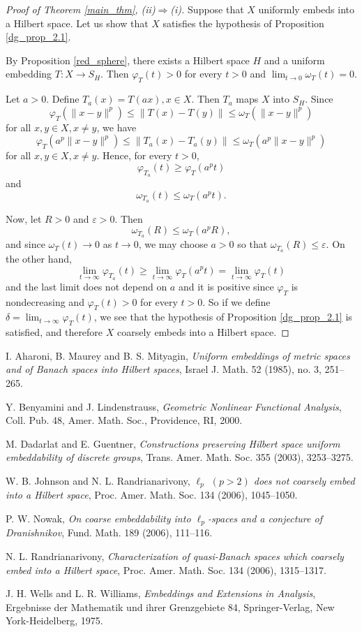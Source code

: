 \documentclass[a4paper,oneside]{amsart}
\theoremstyle{definition}
\begin{document}
\begin{proof}[Proof of Theorem \ref{main_thm}, (ii)$\Rightarrow$(i)]
Suppose that $X$ uniformly embeds into a Hilbert space. Let us show that $X$ satisfies the hypothesis of Proposition \ref{dg_prop_2.1}. 

By Proposition \ref{red_sphere}, there exists a Hilbert space $H$ and a uniform embedding $T:X\to S_H$. Then $\varphi_T(t)>0$ for every $t>0$ and $\lim_{t\to0}\omega_T(t)=0$. 

Let $a>0$. Define $T_a(x)=T(ax),x\in X$. Then $T_a$ maps $X$ into $S_H$. Since 
$$\varphi_T(\|x-y\|^p)\leq\|T(x)-T(y)\|\leq\omega_T(\|x-y\|^p)$$
for all $x,y\in X,x\neq y$, we have
$$\varphi_T(a^p\|x-y\|^p)\leq\|T_a(x)-T_a(y)\|\leq\omega_T(a^p\|x-y\|^p)$$
for all $x,y\in X,x\neq y$. Hence, for every $t>0$,
$$\varphi_{T_a}(t)\geq\varphi_T(a^pt)$$
and
$$\omega_{T_a}(t)\leq\omega_T(a^pt).$$

Now, let $R>0$ and $\varepsilon>0$. Then 
$$\omega_{T_a}(R)\leq\omega_T(a^pR),$$ 
and since $\omega_T(t)\to0$ as $t\to0$, we may choose $a>0$ so that $\omega_{T_a}(R)\leq\varepsilon$. On the other hand, $$\lim_{t\to\infty}\varphi_{T_a}(t)\geq\lim_{t\to\infty}\varphi_T(a^pt)=\lim_{t\to\infty}\varphi_T(t)$$ 
and the last limit does not depend on $a$ and it is positive since $\varphi_T$ is nondecreasing and $\varphi_T(t)>0$ for every $t>0$. So if we define $\delta=\lim_{t\to\infty}\varphi_T(t)$, we see that the hypothesis of Proposition \ref{dg_prop_2.1} is satisfied, and therefore $X$ coarsely embeds into a Hilbert space.
\end{proof}

\begin{thebibliography}{WWW}

 I. Aharoni, B. Maurey and B. S. Mityagin, \emph{Uniform embeddings of metric spaces and of
Banach spaces into Hilbert spaces}, Israel J. Math. 52 (1985), no. 3, 251--265.

 Y. Benyamini and J. Lindenstrauss, \emph{Geometric Nonlinear Functional Analysis}, Coll. Pub.
48, Amer. Math. Soc., Providence, RI, 2000.

 M. Dadarlat and E. Guentner, \emph{Constructions preserving Hilbert space uniform embeddability of discrete groups}, Trans. Amer. Math. Soc. 355 (2003), 3253--3275.

 W. B. Johnson and N. L. Randrianarivony, \emph{$\ell_p$ $(p > 2)$ does not coarsely embed into a
Hilbert space}, Proc. Amer. Math. Soc. 134 (2006), 1045--1050.

 P. W. Nowak, \emph{On coarse embeddability into $\ell_p$-spaces and a conjecture of Dranishnikov}, Fund. Math. 189 (2006), 111--116.

 N. L. Randrianarivony, \emph{Characterization of quasi-Banach spaces which coarsely embed into a
Hilbert space}, Proc. Amer. Math. Soc. 134 (2006), 1315--1317.

 J. H. Wells and L. R. Williams, \emph{Embeddings and Extensions in Analysis}, Ergebnisse der
Mathematik und ihrer Grenzgebiete 84, Springer-Verlag, New York-Heidelberg, 1975.

\end{thebibliography}
\end{document}
